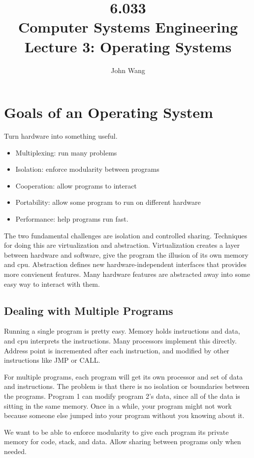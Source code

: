 \documentclass[psamsfonts]{amsart}
\title{6.033 \\
Computer Systems Engineering \\
Lecture 3: Operating Systems}
\author{John Wang}
\begin{document}
\maketitle

\section{Goals of an Operating System}

Turn hardware into something useful.
\begin{itemize}
\item Multiplexing: run many problems
\item Isolation: enforce modularity between programs
\item Cooperation: allow programs to interact
\item Portability: allow some program to run on different hardware
\item Performance: help programs run fast.
\end{itemize}

The two fundamental challenges are isolation and controlled sharing. Techniques for doing this are virtualization and abstraction. Virtualization creates a layer between hardware and software, give the program the illusion of its own memory and cpu. Abstraction defines new hardware-independent interfaces that provides more convienent features. Many hardware features are abstracted away into some easy way to interact with them.

\subsection{Dealing with Multiple Programs}

Running a single program is pretty easy. Memory holds instructions and data, and cpu interprets the instructions. Many processors implement this directly. Address point is incremented after each instruction, and modified by other instructions like JMP or CALL.

For multiple programs, each program will get its own processor and set of data and instructions. The problem is that there is no isolation or boundaries between the programs. Program 1 can modify program 2's data, since all of the data is sitting in the same memory. Once in a while, your program might not work because someone else jumped into your program without you knowing about it.

We want to be able to enforce modularity to give each program its private memory for code, stack, and data. Allow sharing between programs only when needed. 
\end{document}
